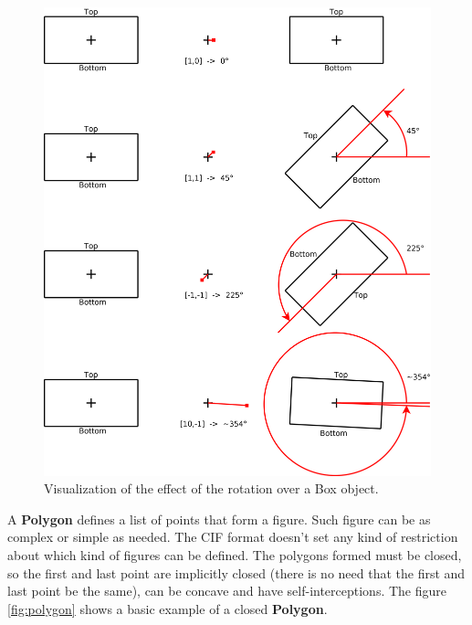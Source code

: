 \documentclass[11pt,twoside,openany,x11names,svgnames]{memoir}
\begin{document}
\begin{figure}
	\centering
	\label{fig:boxrotation}
	\includegraphics[scale=0.1, clip=true, trim= 0pt 0pt 0pt 0pt]{images/chapter03-image03}
	\caption{Visualization of the effect of the rotation over a Box object.}
\end{figure}

A \textbf{Polygon} defines a list of points that form a figure. Such figure can be as complex or simple as needed. The CIF format doesn't set any kind of restriction about which kind of figures can be defined. The polygons formed must be closed, so the first and last point are implicitly closed (there is no need that the first and last point be the same), can be concave and have self-interceptions. The figure \ref{fig:polygon} shows a basic example of a closed \textbf{Polygon}.
\end{document}
